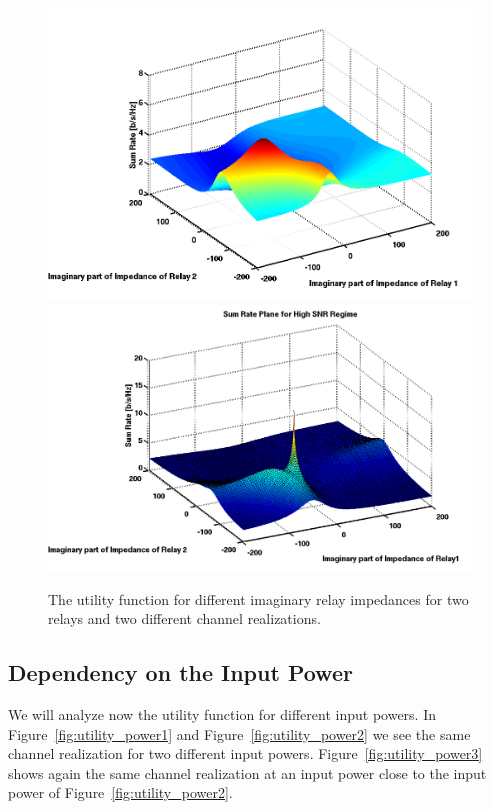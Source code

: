 \begin{figure}
  \includegraphics[width=\linewidth]{images/convex_1.png}
   \label{fig:convex_1}
\endminipage%
{}
  \includegraphics[width=\linewidth]{images/convex_2.png}
   \label{fig:convex_2}
\endminipage\hfill
\caption{The utility function for different imaginary relay impedances for two relays and two different channel realizations.}
   \label{fig:convex_3}
\end{figure}


\subsection{Dependency on the Input Power}
\label{sec:}

We will analyze now the utility function for different input powers.
In Figure~\ref{fig:utility_power1} and Figure~\ref{fig:utility_power2} we see the same channel realization for two different input powers.
Figure~\ref{fig:utility_power3} shows again the same channel realization at an input power close to the input power of Figure~\ref{fig:utility_power2}.


